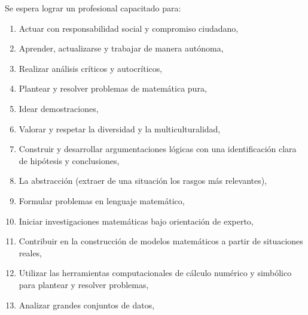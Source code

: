 \documentclass[a4paper, 12pt]{article}
\begin{document}
Se espera lograr un profesional capacitado para:
\begin{enumerate}

\item { Actuar con responsabilidad social y compromiso
ciudadano,} 



\item {Aprender, actualizarse y trabajar de manera autónoma,} 
 


\item {Realizar análisis  críticos y autocríticos,} 
 
\item {Plantear y resolver problemas de matemática pura,} 

\item{Idear demostraciones,}

\item {Valorar y respetar  la diversidad
y la multiculturalidad,} 
 




 

\item {Construir y desarrollar
argumentaciones lógicas con una
identificación clara de hipótesis y conclusiones,} 
 
\item {La abstracción (extraer de una situación los rasgos más relevantes),} 
 


\item {Formular problemas
en lenguaje matemático,} 
 

  


\item {Iniciar investigaciones
matemáticas bajo orientación de experto,} 
 


 
 


\item {Contribuir en la
construcción de modelos matemáticos a
partir de situaciones reales,} 
 


\item {Utilizar las herramientas
computacionales de cálculo numérico
y simbólico para plantear y resolver
problemas,} 
 


\item {Analizar  grandes conjuntos de datos,} 
 



\end{enumerate}
\end{document}
